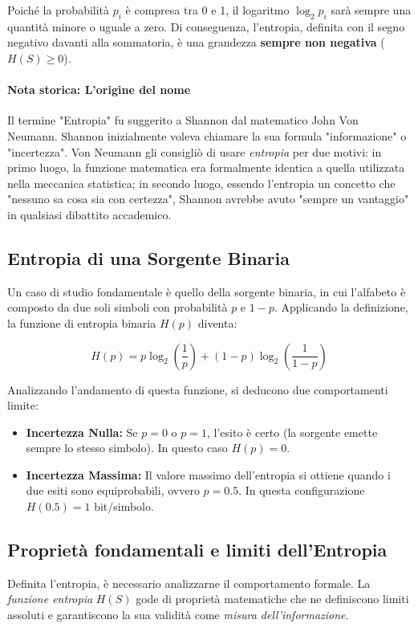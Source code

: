Poiché la probabilità $p_i$ è compresa tra 0 e 1, il logaritmo $\log_2 p_i$ sarà sempre una quantità minore o uguale a zero. Di conseguenza, l'entropia, definita con il segno negativo davanti alla sommatoria, è una grandezza \textbf{sempre non negativa} ($H(S) \ge 0$).
\paragraph*{Nota storica: L'origine del nome}
Il termine "Entropia" fu suggerito a Shannon dal matematico John Von Neumann. Shannon inizialmente voleva chiamare la sua formula "informazione" o "incertezza". Von Neumann gli consigliò di usare \textit{entropia} per due motivi: in primo luogo, la funzione matematica era formalmente identica a quella utilizzata nella meccanica statistica; in secondo luogo, essendo l'entropia un concetto che "nessuno sa cosa sia con certezza", Shannon avrebbe avuto "sempre un vantaggio" in qualsiasi dibattito accademico.

\subsection{Entropia di una Sorgente Binaria}
Un caso di studio fondamentale è quello della sorgente binaria, in cui l'alfabeto è composto da due soli simboli con probabilità $p$ e $1-p$. Applicando la definizione, la funzione di entropia binaria $H(p)$ diventa:

\[ H(p) = p \log_2 \left( \frac{1}{p} \right) + (1-p) \log_2 \left( \frac{1}{1-p} \right) \]

Analizzando l'andamento di questa funzione, si deducono due comportamenti limite:
\begin{itemize}
    \item \textbf{Incertezza Nulla:} Se $p=0$ o $p=1$, l'esito è certo (la sorgente emette sempre lo stesso simbolo). In questo caso $H(p) = 0$.
    \item \textbf{Incertezza Massima:} Il valore massimo dell'entropia si ottiene quando i due esiti sono equiprobabili, ovvero $p = 0.5$. In questa configurazione $H(0.5) = 1$ bit/simbolo.
\end{itemize}

\subsection{Proprietà fondamentali  e limiti dell'Entropia}
Definita l'entropia, è necessario analizzarne il comportamento formale. La \textit{funzione entropia} $H(S)$ gode di proprietà matematiche che ne definiscono limiti assoluti e garantiscono la sua validità come \textit{misura dell'informazione}.

